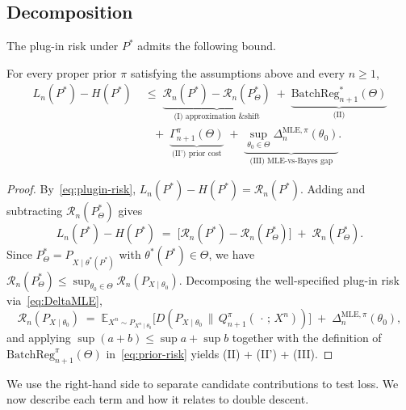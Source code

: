 \subsection{Decomposition}
\label{sec:decomp}

The plug-in risk under $P^*$ admits the following bound.

\begin{theorem}
\label{thm:decomp}
For every proper prior $\pi$ satisfying the assumptions above and every $n\ge 1$,
\begin{equation}
\begin{aligned}
L_n(P^*)-H(P^*)
&\;\le\;
\underbrace{\mathcal{R}_n(P^*)-\mathcal{R}_n(P^*_\Theta)}_{\text{(I)\ approximation \& shift}}
\;+\;
\underbrace{\mathrm{BatchReg}^*_{n+1}(\Theta)}_{\text{(II)}}\\
&\quad+\;
\underbrace{\Gamma^\pi_{n+1}(\Theta)}_{\text{(II') prior cost}}
\;+\;
\underbrace{\sup_{\theta_0\in\Theta}\Delta^{\mathrm{MLE},\pi}_n(\theta_0)}_{\text{(III)\ MLE-vs-Bayes gap}}.
\end{aligned}
\label{eq:decomp}
\end{equation}
\end{theorem}
\begin{proof}
By~\eqref{eq:plugin-risk}, $L_n(P^*)-H(P^*)=\mathcal{R}_n(P^*)$. Adding and
subtracting $\mathcal{R}_n(P^*_\Theta)$ gives
\begin{equation*}
L_n(P^*)-H(P^*)
\;=\;\big[\mathcal{R}_n(P^*)-\mathcal{R}_n(P^*_\Theta)\big]
\;+\;\mathcal{R}_n(P^*_\Theta).
\end{equation*}
Since $P^*_\Theta=P_{X\mid\theta^*(P^*)}$ with $\theta^*(P^*)\in\Theta$, we have
$\mathcal{R}_n(P^*_\Theta)\le\sup_{\theta_0\in\Theta}\mathcal{R}_n(P_{X\mid\theta_0})$.
Decomposing the well-specified plug-in risk via~\eqref{eq:DeltaMLE},
\begin{equation*}
\mathcal{R}_n(P_{X\mid\theta_0})
\;=\;
\mathbb{E}_{X^n\sim P_{X^n\mid\theta_0}}\!\Big[D\!\left(P_{X\mid\theta_0}\,\big\|\,Q^\pi_{n+1}(\,\cdot\,;\,X^n)\right)\Big]
\;+\;\Delta^{\mathrm{MLE},\pi}_n(\theta_0),
\end{equation*}
and applying $\sup(a+b)\le\sup a+\sup b$ together with the definition
of $\mathrm{BatchReg}^\pi_{n+1}(\Theta)$ in~\eqref{eq:prior-risk} yields
(II) + (II') + (III).
\end{proof}

We use the right-hand side to separate candidate contributions to test loss. We now
describe each term and how it relates to double descent.

